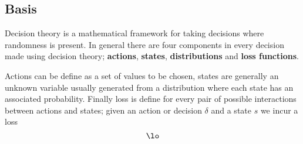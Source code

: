 \documentclass[../../main.tex]{subfiles}
\begin{document}
\subsection{Basis}
Decision theory is a mathematical framework for taking decisions where randomness is present. In general there are four components in every decision made using decision theory; \textbf{actions}, \textbf{states}, \textbf{distributions} and \textbf{loss functions}.

Actions can be define as a set of values to be chosen, states are generally an unknown variable usually generated from a distribution where each state has an associated probability. Finally loss is define for every pair of possible interactions between actions and states; given an action or decision $\delta$ and a state $s$ we incur a loss 
\begin{equation*}
    \lo
\end{equation*}
\end{document}
